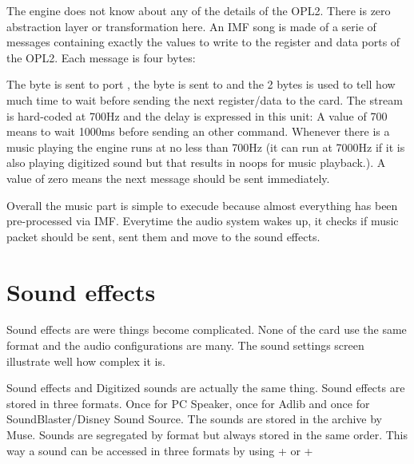 \par
The engine does not know about any of the details of the OPL2. There is zero abstraction layer or transformation here. An IMF song is made of a serie of messages containing exactly the values to write to the register and data ports of the OPL2. Each message is four bytes:\\
\par
\begin{minipage}{\textwidth}

\end{minipage}
\par
The  byte is sent to port , the  byte is sent to  and the  2 bytes is used to tell how much time to wait before sending the next register/data to the card. The stream is hard-coded at 700Hz and the delay is expressed in this unit: A value of 700 means to wait 1000ms before sending an other command. Whenever there is a music playing the engine runs at no less than 700Hz (it can run at 7000Hz if it is also playing digitized sound but that results in noops for music playback.). A value of zero means the next message should be sent immediately.\\
\par
Overall the music part is simple to execude because almost everything has been pre-processed via IMF. Everytime the audio system wakes up, it checks if music packet should be sent, sent them and move to the sound effects.










\section{Sound effects}
Sound effects are were things become complicated. None of the card use the same format and
the audio configurations are many. The sound settings screen illustrate well how complex it is.
\par
\begin{figure}[H]
\centering
 \end{figure}
\par
Sound effects and Digitized sounds are actually the same thing. Sound effects are stored in three formats. Once for PC Speaker, once for Adlib and once for SoundBlaster/Disney Sound Source. The sounds are stored in the  archive by Muse. Sounds are segregated by format but always stored in the same order. This way a sound can be accessed in three formats by using  +  or  + \\

